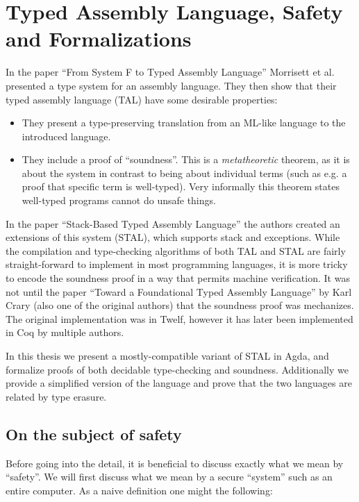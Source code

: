 \chapter{Typed Assembly Language, Safety and Formalizations}

In the paper ``From System F to Typed Assembly Language'' Morrisett et
al. presented a type system for an assembly language. They then show that their
typed assembly language (TAL) have some desirable properties:

\begin{itemize}
\item They present a type-preserving translation from an ML-like language to the
  introduced language.
\item They include a proof of ``soundness''. This is a \emph{metatheoretic}
  theorem, as it is about the system in contrast to being about individual terms
  (such as e.g. a proof that specific term is well-typed). Very informally this
  theorem states well-typed programs cannot do unsafe things.
\end{itemize}

In the paper ``Stack-Based Typed Assembly Language'' the authors created an
extensions of this system (STAL), which supports stack and exceptions. While the
compilation and type-checking algorithms of both TAL and STAL are fairly
straight-forward to implement in most programming languages, it is more tricky
to encode the soundness proof in a way that permits machine verification. It was
not until the paper ``Toward a Foundational Typed Assembly Language'' by Karl
Crary (also one of the original authors) that the soundness proof was
mechanizes. The original implementation was in Twelf, however it has later been
implemented in Coq by multiple authors.

In this thesis we present a mostly-compatible variant of STAL in Agda, and
formalize proofs of both decidable type-checking and soundness. Additionally we
provide a simplified version of the language and prove that the two languages
are related by type erasure.

\section{On the subject of safety}

Before going into the detail, it is beneficial to discuss exactly what we mean
by ``safety''. We will first discuss what we mean by a secure ``system'' such as
an entire computer. As a naive definition one might the following:

